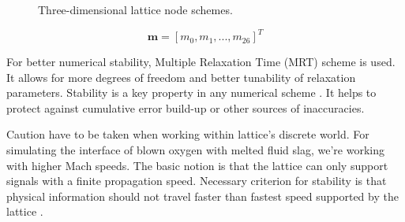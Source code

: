 \begin{figure}[!ht]
	\centering
	\qquad
	\caption{Three-dimensional lattice node schemes.}
	\label{fig:lattice-node-schemes}
\end{figure}


\begin{equation}
	\label{eq:moments}
	\bm{m} = [m_0, m_1,...,m_{26}]^T
\end{equation}

For better numerical stability, Multiple Relaxation Time (MRT) scheme is used. It allows for more degrees of freedom and better tunability of relaxation parameters. Stability is a key property in any numerical scheme \cite{succi2001lattice}. It helps to protect against cumulative error build-up or other sources of inaccuracies.

Caution have to be taken when working within lattice's discrete world. For simulating the interface of blown oxygen with melted fluid slag, we're working with higher Mach speeds. The basic notion is that the lattice can only support signals with a finite propagation speed. Necessary criterion for stability is that physical information should not travel faster than fastest speed supported by the lattice \cite{succi2001lattice}.

